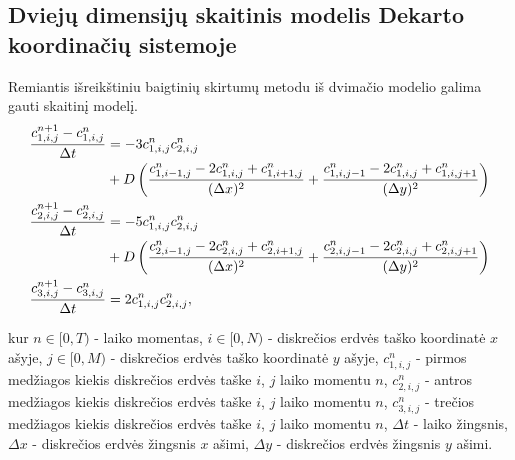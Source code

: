 \documentclass{VUMIFInfKursinis}
\begin{document}
\subsection{Dviejų dimensijų skaitinis modelis Dekarto koordinačių sistemoje}

Remiantis išreikštiniu baigtinių skirtumų metodu iš dvimačio modelio galima gauti skaitinį modelį.
\begin{subequations} \label{numerical-eqs}
\begin{align}
\frac{c^{n+1}_{1,i,j}-c^n_{1,i,j}}{\Delta t}&=
-3c^{n}_{1,i,j}c^{n}_{2,i,j}\notag\\
&+D\left(\frac{c^n_{1,i-1,j}-2c^n_{1,i,j}+c^n_{1,i+1,j}}{(\Delta x)^2}+\frac{c^n_{1,i,j-1}-2c^n_{1,i,j}+c^n_{1,i,j+1}}{(\Delta y)^2}\right)\\
\frac{c^{n+1}_{2,i,j}-c^n_{2,i,j}}{\Delta t}&=
-5c^{n}_{1,i,j}c^{n}_{2,i,j}\notag\\
&+D\left(\frac{c^n_{2,i-1,j}-2c^n_{2,i,j}+c^n_{2,i+1,j}}{(\Delta x)^2}+\frac{c^n_{2,i,j-1}-2c^n_{2,i,j}+c^n_{2,i,j+1}}{(\Delta y)^2}\right)\\
\frac{c^{n+1}_{3,i,j}-c^n_{3,i,j}}{\Delta t}&=2c^{n}_{1,i,j}c^{n}_{2,i,j},
\end{align}
\end{subequations}

kur $n\in[0, T)$ - laiko momentas, 
$i\in[0,N)$ - diskrečios erdvės taško koordinatė $x$ ašyje,
$j\in[0,M)$ - diskrečios erdvės taško koordinatė $y$ ašyje,
$c^n_{1,i,j}$ - pirmos medžiagos kiekis diskrečios erdvės taške $i$, $j$ laiko momentu $n$,
$c^n_{2,i,j}$ - antros medžiagos kiekis diskrečios erdvės taške $i$, $j$ laiko momentu $n$,
$c^n_{3,i,j}$ - trečios medžiagos kiekis diskrečios erdvės taške $i$, $j$ laiko momentu $n$,
$\Delta t$ - laiko žingsnis,
$\Delta x$ - diskrečios erdvės žingsnis $x$ ašimi,
$\Delta y$ - diskrečios erdvės žingsnis $y$ ašimi.





\end{document}
